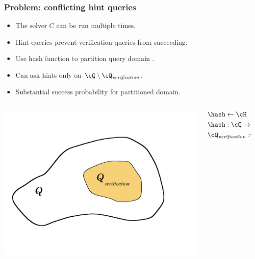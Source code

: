 \documentclass[first,firstsupp,notes, handout, last]{ETHclass}
\begin{document}
\begin{frame}[t]
  \frametitle{Problem: conflicting hint queries}
  \begin{itemize}
    \item<1-5> The solver $C$ can be run multiple times.
    \item<2-5> Hint queries prevent verification queries from succeeding.
    \item<3-5> Use hash function to partition query domain \cite{dodis2009security}.
    \item<4-5> Can ask hints only on $\cQ \setminus \cQ_{\mathit{verification}}$.
    \item<5> Substantial success probability for partitioned domain.
  \end{itemize}
  \begin{columns}
    \begin{column}{.4\textwidth}
      \includegraphics[scale=0.08]{images/hashSets.pdf}
    \end{column}
    \begin{column}{.4\textwidth}
      \begin{align*}
        &\hash \leftarrow \cH \\
        &\hash : \cQ \rightarrow \{0,1,\dots, 2(h+v) - 1\} \\
        &\cQ_{\mathit{verification}} := {q \in \cQ : hash(q) = 0}
      \end{align*}
    \end{column}
  \end{columns}
\end{frame}
\end{document}
